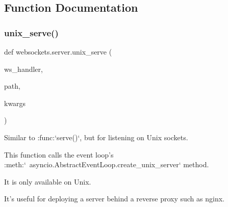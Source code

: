 \subsection{Function Documentation}
\mbox{\label{namespacewebsockets_1_1server_a87c4bd8b9d6a51924dcb6acdad9db174}} 
\subsubsection{\texorpdfstring{unix\+\_\+serve()}{unix\_serve()}}
{\footnotesize\ttfamily def websockets.\+server.\+unix\+\_\+serve (\begin{DoxyParamCaption}\item[{}]{ws\+\_\+handler,  }\item[{}]{path,  }\item[{}]{kwargs }\end{DoxyParamCaption})}

\begin{DoxyVerb}Similar to :func:`serve()`, but for listening on Unix sockets.

This function calls the event loop's
:meth:`~asyncio.AbstractEventLoop.create_unix_server` method.

It is only available on Unix.

It's useful for deploying a server behind a reverse proxy such as nginx.\end{DoxyVerb}
 